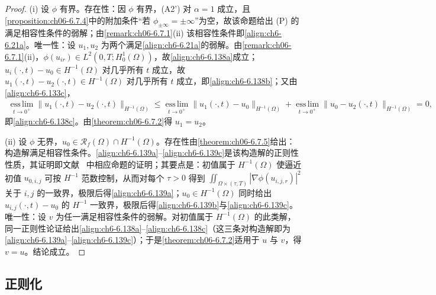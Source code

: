 \documentclass[../../main.tex]{subfiles}%
\begin{document}
\begin{proof}
(i) 设 $\phi$ 有界。存在性：因 $\phi$ 有界，(A2') 对 $\alpha=1$ 成立，且\cref{proposition:ch06-6.7.4}中的附加条件“若 $\phi_{\pm\infty}=\pm\infty$”为空，故该命题给出 (P) 的满足相容性条件的弱解；由\cref{remark:ch06-6.7.1}(ii) 该相容性条件即\eqref{align:ch6-6.21a}。唯一性：设 $u_1,u_2$ 为两个满足\eqref{align:ch6-6.21a}的弱解。由\cref{remark:ch06-6.7.1}(ii)，$\phi(u_{ir})\in L^2(0,T;H^1_0(\Omega))$，故\eqref{align:ch6-6.138a}成立；$u_i(\cdot,t)-u_0\in H^{-1}(\Omega)$ 对几乎所有 $t$ 成立，故 $u_1(\cdot,t)-u_2(\cdot,t)\in H^{-1}(\Omega)$ 对几乎所有 $t$ 成立，即\eqref{align:ch6-6.138b}；又由\eqref{align:ch6-6.133c}，
\begin{align*}
\operatorname*{ess\,lim}_{t\to0^+}\|u_1(\cdot,t)-u_2(\cdot,t)\|_{H^{-1}(\Omega)}
\leqslant\operatorname*{ess\,lim}_{t\to0^+}\|u_1(\cdot,t)-u_0\|_{H^{-1}(\Omega)}
+\operatorname*{ess\,lim}_{t\to0^+}\|u_0-u_2(\cdot,t)\|_{H^{-1}(\Omega)}=0,
\end{align*}
即\eqref{align:ch6-6.138c}。由\cref{theorem:ch06-6.7.2}得 $u_1=u_2$。

(ii) 设 $\phi$ 无界，$u_0\in\mathscr{R}_f(\Omega)\cap H^{-1}(\Omega)$。存在性由\cref{theorem:ch06-6.7.5}给出：构造解满足相容性条件。\eqref{align:ch6-6.139a}--\eqref{align:ch6-6.139c}是该构造解的正则性性质，其证明即文献~\cite{ref87} 中相应命题的证明；其要点是：初值属于 $H^{-1}(\Omega)$ 使逼近初值 $u_{0,i,j}$ 可按 $H^{-1}$ 范数控制，从而对每个 $\tau>0$ 得到 $\iint_{\Omega\times(\tau,T)}|\nabla\phi(u_{i,j,r})|^2$ 关于 $i,j$ 的一致界，极限后得\eqref{align:ch6-6.139a}；$u_0\in H^{-1}(\Omega)$ 同时给出 $u_{i,j}(\cdot,t)-u_0$ 的 $H^{-1}$ 一致界，极限后得\eqref{align:ch6-6.139b}与\eqref{align:ch6-6.139c}。唯一性：设 $v$ 为任一满足相容性条件的弱解。对初值属于 $H^{-1}(\Omega)$ 的此类解，同一正则性论证给出\eqref{align:ch6-6.138a}--\eqref{align:ch6-6.138c}（这三条对构造解即为\eqref{align:ch6-6.139a}--\eqref{align:ch6-6.139c}）；于是\cref{theorem:ch06-6.7.2}适用于 $u$ 与 $v$，得 $v=u$。结论成立。
\end{proof}

\subsection{正则化}\label{subsection:ch06-无界正则}
\end{document}
